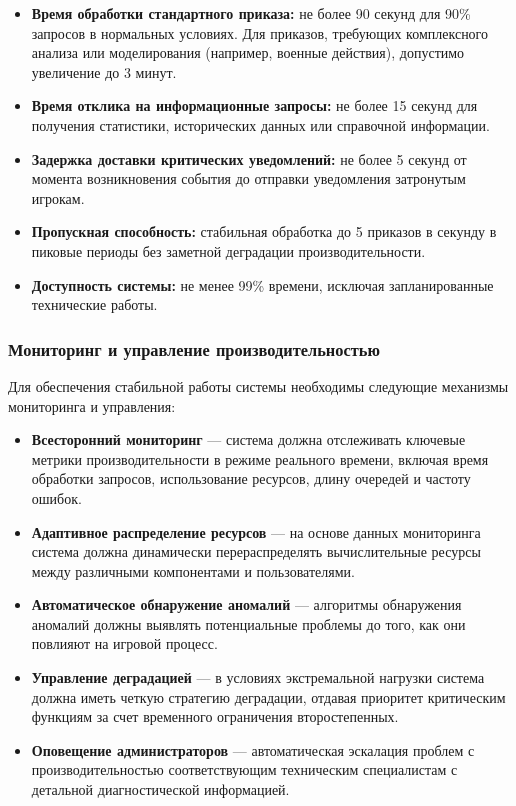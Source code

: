 \begin{itemize}
    \item \textbf{Время обработки стандартного приказа:} не более 90 секунд для 90\% запросов в нормальных условиях. Для приказов, требующих комплексного анализа или моделирования (например, военные действия), допустимо увеличение до 3 минут.

    \item \textbf{Время отклика на информационные запросы:} не более 15 секунд для получения статистики, исторических данных или справочной информации.

    \item \textbf{Задержка доставки критических уведомлений:} не более 5 секунд от момента возникновения события до отправки уведомления затронутым игрокам.

    \item \textbf{Пропускная способность:} стабильная обработка до 5 приказов в секунду в пиковые периоды без заметной деградации производительности.

    \item \textbf{Доступность системы:} не менее 99\% времени, исключая запланированные технические работы.
\end{itemize}

\subsubsection{Мониторинг и управление производительностью}

Для обеспечения стабильной работы системы необходимы следующие механизмы мониторинга и управления:

\begin{itemize}
    \item \textbf{Всесторонний мониторинг} — система должна отслеживать ключевые метрики производительности в режиме реального времени, включая время обработки запросов, использование ресурсов, длину очередей и частоту ошибок.

    \item \textbf{Адаптивное распределение ресурсов} — на основе данных мониторинга система должна динамически перераспределять вычислительные ресурсы между различными компонентами и пользователями.

    \item \textbf{Автоматическое обнаружение аномалий} — алгоритмы обнаружения аномалий должны выявлять потенциальные проблемы до того, как они повлияют на игровой процесс.

    \item \textbf{Управление деградацией} — в условиях экстремальной нагрузки система должна иметь четкую стратегию деградации, отдавая приоритет критическим функциям за счет временного ограничения второстепенных.

    \item \textbf{Оповещение администраторов} — автоматическая эскалация проблем с производительностью соответствующим техническим специалистам с детальной диагностической информацией.
\end{itemize}

